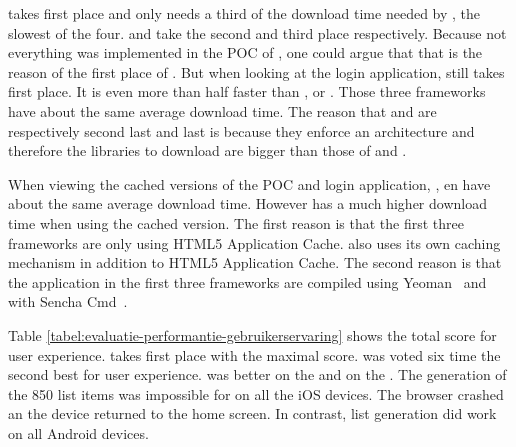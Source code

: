 \documentclass[a4paper]{artikel3}
\newcommand{\setspace}[0]{\vspace{2mm}}
\renewcommand{\paragraph}[1]{\setspace \noindent {\bf #1}  }
\begin{document}
\lungo{} takes first place and only needs a third of the download time needed by \sta{}, the slowest of the four.
\jqma{} and \kendob{} take the second and third place respectively.
Because not everything was implemented in the POC of \lungo{}, one could argue that that is the reason of the first place of \lungo{}.
But when looking at the login application, \lungo{} still takes first place.
It is even more than half faster than \jqma{}, \kendob{} or \sta{}.
Those three frameworks have about the same average download time.
The reason that \kendob{} and \sta{} are respectively second last and last is because they enforce an architecture and therefore the libraries to download are bigger than those of \lungo{} and \jqma{}.

When viewing the cached versions of the POC and login application, \kendob{}, \jqma{} en \lungo{} have about the same average download time.
However \st{} has a much higher download time when using the cached version.
The first reason is that the first three frameworks are only using HTML5 Application Cache.
\sta{} also uses its own caching mechanism in addition to HTML5 Application Cache.
The second reason is that the application in the first three frameworks are compiled using Yeoman~\cite{Yeoman2013} and \st{} with Sencha Cmd~\cite{Sencha2012}.


\paragraph{User experience}
Table \ref{tabel:evaluatie-performantie-gebruikerservaring} shows the total score for user experience.
\sta{} takes first place with the maximal score.
\jqma{} was voted six time the second best for user experience.
\kendob{} was better on the \htc{} and \lungo{} on the \ipadiii{}.
The generation of the 850 list items was impossible for \kendob{} on all the iOS devices.
The browser crashed an the device returned to the home screen.
In contrast, list generation did work on all Android devices.
\end{document}
